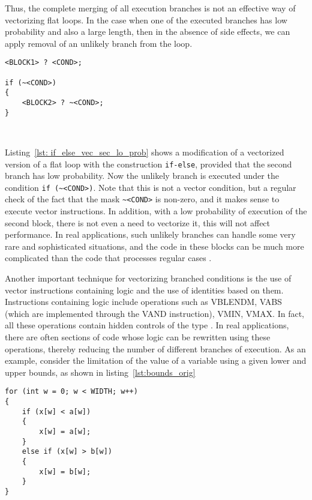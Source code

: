 \documentclass[
11pt,%
tightenlines,%
twoside,%
onecolumn,%
nofloats,%
nobibnotes,%
nofootinbib,%
superscriptaddress,%
noshowpacs,%
centertags]%
{revtex4}
\begin{document}
Thus, the complete merging of all execution branches is not an effective way of vectorizing flat loops.
In the case when one of the executed branches has low probability and also a large length, then in the absence of side effects, we can apply  removal of an unlikely branch from the loop.

\begin{lstlisting}[caption={Vectorization of \texttt{if-else} with unlikely branch.},label={lst:if_else_vec_sec_lo_prob}]
<BLOCK1> ? <COND>;

if (~<COND>)
{
    <BLOCK2> ? ~<COND>;
}
\end{lstlisting}

\

Listing~\ref{lst: if_else_vec_sec_lo_prob} shows a modification of a vectorized version of a flat loop with the construction \texttt{if-else}, provided that the second branch has low probability.
Now the unlikely branch is executed under the condition \texttt{if (\~{}<COND>)}.
Note that this is not a vector condition, but a regular check of the fact that the mask \texttt{\~{}<COND>} is non-zero, and it makes sense to execute vector instructions.
In addition, with a low probability of execution of the second block, there is not even a need to vectorize it, this will not affect performance.
In real applications, such unlikely branches can handle some very rare and sophisticated situations, and the code in these blocks can be much more complicated than the code that processes regular cases \cite{Rybakov_Aircraft}.

Another important technique for vectorizing branched conditions is the use of vector instructions containing logic and the use of identities based on them.
Instructions containing logic include operations such as VBLENDM, VABS (which are implemented through the VAND instruction), VMIN, VMAX.
In fact, all these operations contain hidden controls of the type .
In real applications, there are often sections of code whose logic can be rewritten using these operations, thereby reducing the number of different branches of execution.
As an example, consider the limitation of the value of a variable using a given lower and upper bounds, as shown in listing~\ref{lst:bounds_orig}

\begin{lstlisting}[caption={Limiting the value using the lower and upper bounds.},label={lst:bounds_orig}]
for (int w = 0; w < WIDTH; w++)
{
    if (x[w] < a[w])
    {
        x[w] = a[w];
    }
    else if (x[w] > b[w])
    {
        x[w] = b[w];
    }
}
\end{lstlisting}
\end{document}
